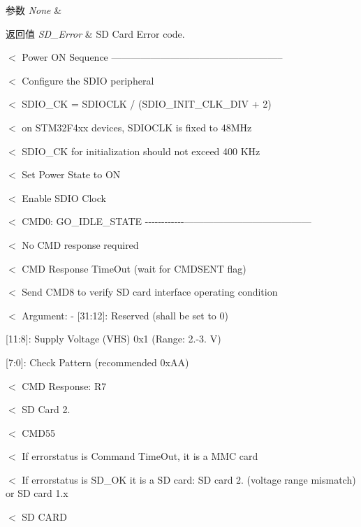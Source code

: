 \begin{DoxyParams}{参数}
{\em None} & \\
\hline
\end{DoxyParams}

\begin{DoxyRetVals}{返回值}
{\em S\+D\+\_\+\+Error} & SD Card Error code. \\
\hline
\end{DoxyRetVals}
$<$ Power ON Sequence -----------------------------------------------------

$<$ Configure the S\+D\+IO peripheral

$<$ S\+D\+I\+O\+\_\+\+CK = S\+D\+I\+O\+C\+LK / (S\+D\+I\+O\+\_\+\+I\+N\+I\+T\+\_\+\+C\+L\+K\+\_\+\+D\+IV + 2)

$<$ on S\+T\+M32\+F4xx devices, S\+D\+I\+O\+C\+LK is fixed to 48\+M\+Hz

$<$ S\+D\+I\+O\+\_\+\+CK for initialization should not exceed 400 K\+Hz

$<$ Set Power State to ON

$<$ Enable S\+D\+IO Clock

$<$ C\+M\+D0\+: G\+O\+\_\+\+I\+D\+L\+E\+\_\+\+S\+T\+A\+TE -\/-\/-\/-\/-\/-\/-\/-\/-\/-\/-\/-\/---------------------------------------

$<$ No C\+MD response required

$<$ C\+MD Response Time\+Out (wait for C\+M\+D\+S\+E\+NT flag)

$<$ Send C\+M\+D8 to verify SD card interface operating condition

$<$ Argument\+: -\/ \mbox{[}31\+:12\mbox{]}\+: Reserved (shall be set to \textquotesingle{}0\textquotesingle{})
\begin{DoxyItemize}
\item \mbox{[}11\+:8\mbox{]}\+: Supply Voltage (V\+HS) 0x1 (Range\+: 2.-\/3. V)
\item \mbox{[}7\+:0\mbox{]}\+: Check Pattern (recommended 0x\+AA)
\end{DoxyItemize}

$<$ C\+MD Response\+: R7

$<$ SD Card 2.

$<$ C\+M\+D55

$<$ If errorstatus is Command Time\+Out, it is a M\+MC card

$<$ If errorstatus is S\+D\+\_\+\+OK it is a SD card\+: SD card 2. (voltage range mismatch) or SD card 1.\+x

$<$ SD C\+A\+RD

